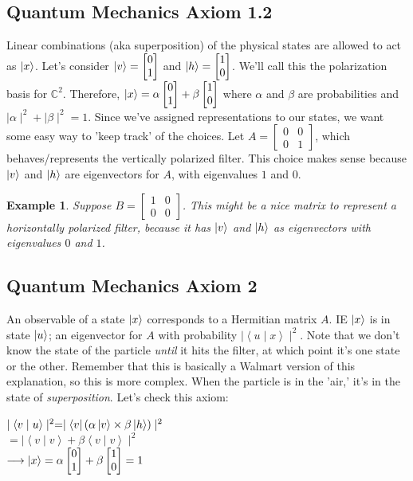\documentclass[12pt]{article}
\theoremstyle{plain}
\theoremstyle{nonumberplain}
\theoremstyle{plain}
\newtheorem{example}[lemma]{Example}
\theoremstyle{nonumberplain}
\newcommand\1{{\bf 1}}
\newcommand{\bmat}[1]{\begin{bmatrix*} #1 \end{bmatrix*}} %
\newcommand{\C}{\mathbb{C}} %
\newcommand{\<}{\left\langle}
\renewcommand{\>}{\right\rangle}
\newcommand{\inp}[2]{\left\langle#1\mid #2\right\rangle} %
\begin{document}

\subsection{Quantum Mechanics Axiom 1.2}
Linear combinations (aka superposition) of the physical states are allowed to act as $\ket{x}$. Let's consider $\ket{v}=\bmat{0 \\ 1}$ and $\ket{h}=\bmat{1 \\ 0}$. We'll call this the polarization basis for $\C^2$. Therefore, $\ket{x}=\alpha\bmat{0 \\ 1}+\beta\bmat{1 \\ 0}$ where $\alpha$ and $\beta$ are probabilities and $\mid\alpha\mid^2+\mid\beta\mid^2=1$. Since we've assigned representations to our states, we want some easy way to 'keep track' of the choices. Let $A=\bmat{0 & 0 \\ 0 & 1}$, which behaves/represents the vertically polarized filter. This choice makes sense because $\ket{v}$ and $\ket{h}$ are eigenvectors for $A$, with eigenvalues $1$ and $0$.
\begin{example}
Suppose $B=\bmat{1 & 0 \\ 0 & 0}$. This might be a nice matrix to represent a horizontally polarized filter, because it has $\ket{v}$ and $\ket{h}$ as eigenvectors with eigenvalues $0$ and $1$.
\end{example}


\subsection{Quantum Mechanics Axiom 2}
\label{section:qma2}
An observable of a state $\ket{x}$ corresponds to a Hermitian matrix $A$. IE $\ket{x}$ is in state $\ket{u}$; an eigenvector for $A$ with probability $\mid\inp{u}{x}\mid^2$. Note that we don't know the state of the particle \textit{until} it hits the filter, at which point it's one state or the other. Remember that this is basically a Walmart version of this explanation, so this is more complex. When the particle is in the 'air,' it's in the state of \textit{superposition}. Let's check this axiom: 
\begin{center}
$\mid\inp{v}{u}\mid^2=\mid\bra{v}(\alpha\ket{v}\times\beta\ket{h})\mid^2$ \\ 
$=\mid\inp{v}{v}+\beta\inp{v}{v}\mid^2$ \\
$\longrightarrow\ket{x}=\alpha\bmat{0 \\ 1}+\beta\bmat{1 \\ 0}=1$
\end{center}
\end{document}
